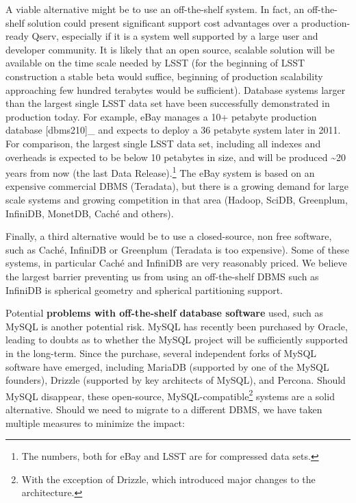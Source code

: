 \documentclass[DM,lsstdraft,toc]{lsstdoc}
\begin{document}
A viable alternative might be to use an off-the-shelf system. In fact,
an off-the-shelf solution could present significant support cost
advantages over a production-ready Qserv, especially if it is a system
well supported by a large user and developer community. It is likely
that an open source, scalable solution will be available on the time
scale needed by LSST (for the beginning of LSST construction a stable
beta would suffice, beginning of production scalability approaching few
hundred terabytes would be sufficient). Database systems larger than the
largest single LSST data set have been successfully demonstrated in
production today. For example, eBay manages a 10+ petabyte production
database {[}dbms210{]}\_ and expects to deploy a 36 petabyte system
later in 2011. For comparison, the largest single LSST data set,
including all indexes and overheads is expected to be below 10 petabytes
in size, and will be produced \textasciitilde{}20 years from now (the
last Data Release).\footnote{The numbers, both for eBay and LSST are for
  compressed data sets.} The eBay system is based on an expensive
commercial DBMS (Teradata), but there is a growing demand for large
scale systems and growing competition in that area (Hadoop, SciDB,
Greenplum, InfiniDB, MonetDB, Caché and others).

Finally, a third alternative would be to use a closed-source, non free
software, such as Caché, InfiniDB or Greenplum (Teradata is too
expensive). Some of these systems, in particular Caché and InfiniDB are
very reasonably priced. We believe the largest barrier preventing us
from using an off-the-shelf DBMS such as InfiniDB is spherical geometry
and spherical partitioning support.

Potential \textbf{problems with off-the-shelf database software} used,
such as MySQL is another potential risk. MySQL has recently been
purchased by Oracle, leading to doubts as to whether the MySQL project
will be sufficiently supported in the long-term. Since the purchase,
several independent forks of MySQL software have emerged, including
MariaDB (supported by one of the MySQL founders),
Drizzle \citep{Drizzle} (supported by key architects of
MySQL), and Percona. Should MySQL disappear, these open-source,
MySQL-compatible\footnote{With the exception of
  Drizzle, which introduced major changes to
  the architecture.} systems are a solid alternative. Should we need to
migrate to a different DBMS, we have taken multiple measures to minimize
the impact:
\end{document}

